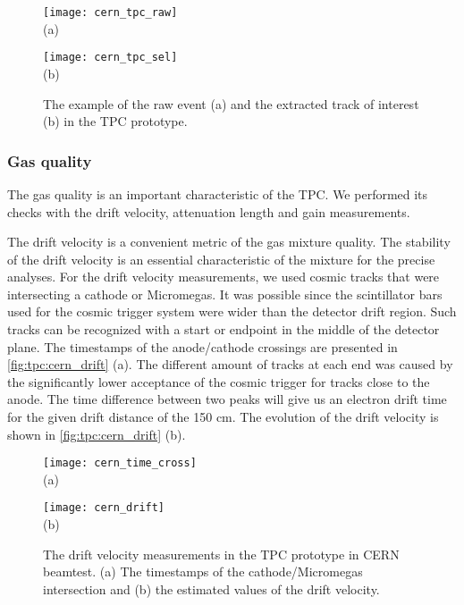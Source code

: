 \documentclass[../main.tex]{subfiles}
\begin{document}
\begin{figure}[!ht]
  \centering
  \begin{minipage}{0.49\linewidth}
    \centering
    \texttt{[image: cern\_tpc\_raw]} \\ (a)
  \end{minipage}
  \begin{minipage}{0.49\linewidth}
    \centering
    \texttt{[image: cern\_tpc\_sel]} \\ (b)
  \end{minipage}
  \caption{The example of the raw event (a) and the extracted track of interest (b) in the TPC prototype.}
  \label{fig:tpc:cern_ph}
\end{figure}

\subsubsection{Gas quality}
The gas quality is an important characteristic of the TPC. We performed its checks with the drift velocity, attenuation length and gain measurements.

The drift velocity is a convenient metric of the gas mixture quality. The stability of the drift velocity is an essential characteristic of the mixture for the precise analyses. For the drift velocity measurements, we used cosmic tracks that were intersecting a cathode or Micromegas. It was possible since the scintillator bars used for the cosmic trigger system were wider than the detector drift region. Such tracks can be recognized with a start or endpoint in the middle of the detector plane. The timestamps of the anode/cathode crossings are presented in \autoref{fig:tpc:cern_drift} (a). The different amount of tracks at each end was caused by the significantly lower acceptance of the cosmic trigger for tracks close to the anode. The time difference between two peaks will give us an electron drift time for the given drift distance of the 150 cm. The evolution of the drift velocity is shown in \autoref{fig:tpc:cern_drift} (b).

\begin{figure}[!ht]
  \centering
  \begin{minipage}{0.49\linewidth}
    \centering
    \texttt{[image: cern\_time\_cross]} \\ (a)
  \end{minipage}
  \begin{minipage}{0.49\linewidth}
    \centering
    \texttt{[image: cern\_drift]} \\ (b)
  \end{minipage}
  \caption{The drift velocity measurements in the TPC prototype in CERN beamtest. (a) The timestamps of the cathode/Micromegas intersection and (b) the estimated values  of the drift velocity.}
  \label{fig:tpc:cern_drift}
\end{figure}
\end{document}
